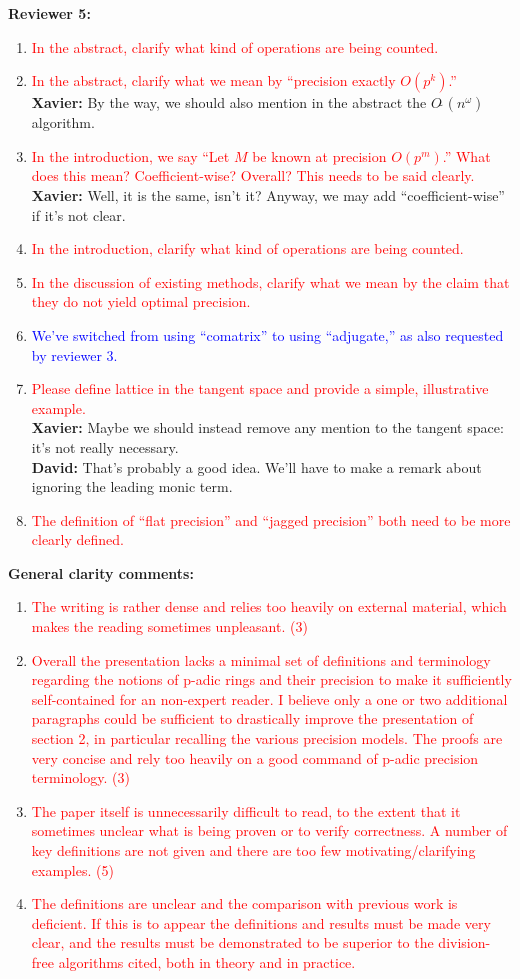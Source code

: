 \documentclass{sig-alternate-05-2015}
\newcommand{\softO}{O\tilde{~}}
\newcommand{\done}[1]{\textcolor{blue}{#1}}
\newcommand{\tdo}[1]{\textcolor{red}{#1}}
\newcommand{\xavier}[1]{\textcolor{answer}{{\bf Xavier:} #1}}
\newcommand{\david}[1]{\textcolor{answer}{{\bf David:} #1}}
\begin{document}
\textbf{Reviewer 5:}
\begin{enumerate}
\item \tdo{In the abstract, clarify what kind of operations are being counted.}
\item \tdo{In the abstract, clarify what we mean by ``precision exactly $O(p^k)$.''}\\
      \xavier{By the way, we should also mention in the abstract the $\softO(n^\omega)$ algorithm.}
\item \tdo{In the introduction, we say ``Let $M$ be known at precision $O(p^m)$.''  What does this mean?  Coefficient-wise?  Overall?  This needs to be said clearly.}\\
      \xavier{Well, it is the same, isn't it? Anyway, we may add ``coefficient-wise'' if it's not clear.}
\item \tdo{In the introduction, clarify what kind of operations are being counted.}
\item \tdo{In the discussion of existing methods, clarify what we mean by the claim that they do not yield optimal precision.}
\item \done{We've switched from using ``comatrix'' to using ``adjugate,'' as also requested by reviewer 3.}
\item \tdo{Please define lattice in the tangent space and provide a simple, illustrative example.}\\
      \xavier{Maybe we should instead remove any mention to the tangent space: it's not really necessary.}\\
      \david{That's probably a good idea.  We'll have to make a remark about ignoring the leading monic term.}
\item \tdo{The definition of ``flat precision'' and ``jagged precision'' both need to be more clearly defined.}
\end{enumerate}
\textbf{General clarity comments:}
\begin{enumerate}
\item \tdo{The writing is rather dense and relies too heavily on external material, which makes the reading sometimes unpleasant. (3)}
\item \tdo{Overall the presentation lacks a minimal set of definitions and terminology regarding the notions of p-adic rings and their precision to make it sufficiently self-contained for an non-expert reader. I believe only a one or two additional paragraphs could be sufficient to drastically improve the presentation of section 2, in particular recalling the various precision models.  The proofs are very concise and rely too heavily on a good command of p-adic precision terminology. (3)}
\item \tdo{The paper itself is unnecessarily difficult to read, to the extent that it sometimes unclear what is being proven or to verify correctness.  A number of key definitions are not given and there are too few motivating/clarifying examples. (5)}
\item \tdo{The definitions are unclear and the comparison with previous work is deficient.  If this is to appear the definitions and results must be made very clear, and the results must be demonstrated to be superior to the division-free algorithms cited, both in theory and in practice.}
\end{enumerate}
\end{document}
